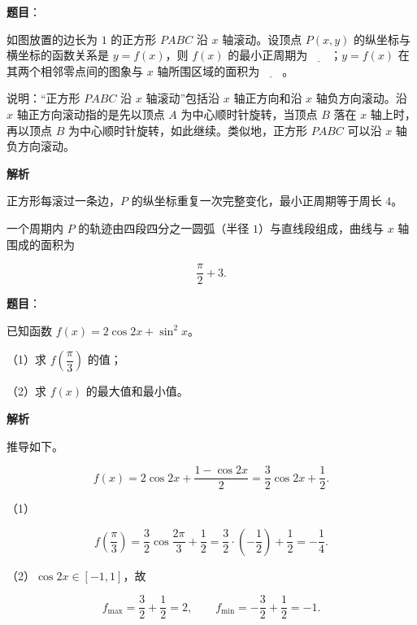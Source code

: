 \begin{answer}

\textbf{题目}：

如图放置的边长为 $1$ 的正方形 $PABC$ 沿 $x$ 轴滚动。设顶点 $P(x,y)$ 的纵坐标与横坐标的函数关系是 $y=f(x)$，则 $f(x)$ 的最小正周期为$\underline{\qquad}$；$y=f(x)$ 在其两个相邻零点间的图象与 $x$ 轴所围区域的面积为$\underline{\qquad}$。

说明：“正方形 $PABC$ 沿 $x$ 轴滚动”包括沿 $x$ 轴正方向和沿 $x$ 轴负方向滚动。沿 $x$ 轴正方向滚动指的是先以顶点 $A$ 为中心顺时针旋转，当顶点 $B$ 落在 $x$ 轴上时，再以顶点 $B$ 为中心顺时针旋转，如此继续。类似地，正方形 $PABC$ 可以沿 $x$ 轴负方向滚动。
\nopagebreak[4]
\begin{center}\end{center}
\nopagebreak[4]
\textbf{解析}

正方形每滚过一条边，$P$ 的纵坐标重复一次完整变化，最小正周期等于周长 $4$。

一个周期内 $P$ 的轨迹由四段四分之一圆弧（半径 $1$）与直线段组成，曲线与 $x$ 轴围成的面积为

\nopagebreak[4]
\[\frac{\pi}{2}+3.\]


\end{answer}
\begin{answer}

\textbf{题目}：

已知函数 $f(x)=2\cos2x+\sin^2x$。

（1）求 $f\left(\dfrac\pi3\right)$ 的值；

（2）求 $f(x)$ 的最大值和最小值。

\textbf{解析}

推导如下。

\nopagebreak[4]
\[f(x)=2\cos2x+\frac{1-\cos2x}2=\frac32\cos2x+\frac12.\]

（1）

\nopagebreak[4]
\[f\left(\frac\pi3\right)=\frac32\cos\frac{2\pi}3+\frac12
=\frac32\cdot\left(-\frac12\right)+\frac12=-\frac14.\]

（2）$\cos2x\in[-1,1]$，故

\nopagebreak[4]
\[f_{\max}=\frac32+\frac12=2,\qquad f_{\min}=-\frac32+\frac12=-1.\]


\end{answer}
